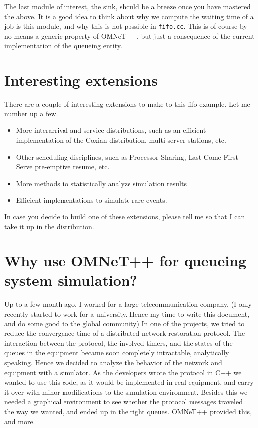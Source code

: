 \documentclass[a4paper]{article}
\begin{document}
The last module  of interest, the sink, should be a breeze once
you have mastered the above. It is a good idea to think about why we
compute the waiting time of a job is this module, and why this is not
possible in \texttt{fifo.cc}. This is of course by no means a generic
property of OMNeT++, but just a consequence of the current
implementation of the queueing entity.

\section{Interesting extensions}
\label{sec:inter-extent}
There are a couple of interesting extensions to make to this fifo
example. Let me number up a few.
\begin{itemize}
\item More interarrival and service distributions, such as an efficient
  implementation of the Coxian distribution, multi-server stations, etc.
\item Other scheduling disciplines, such as Processor Sharing, Last Come First
Serve pre-emptive resume, etc.
\item More methods to statistically analyze simulation results
\item Efficient implementations to simulate rare events.
\end{itemize}
In case you decide to build one of these extensions, please tell me so
that I can take it up in the distribution.

\section{Why use OMNeT++ for queueing system simulation?}
\label{sec:why-use-omnet++}
Up to a few month ago, I worked for a large telecommunication
company. (I only recently started to work for a university. Hence my
time to write this document, and do some good to the global community)  In
one of the projects, we tried to reduce the convergence
time of a distributed network restoration protocol. The interaction
between the protocol, the involved timers, and the states of the
queues in the equipment became soon completely intractable,
analytically speaking.  Hence we decided to analyze the behavior of
the  network and equipment with a  simulator. As the developers wrote the
protocol  in C++ we wanted to use this  code, as it would be
implemented in real  equipment, and carry it over with minor modifications
 to the simulation environment. Besides this we needed a graphical
environment to see whether the protocol messages traveled  the way
we wanted, and ended up in the right queues. OMNeT++ provided this,
and more.
\end{document}
